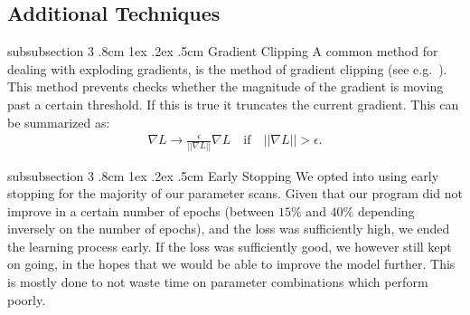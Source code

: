 \documentclass[%
reprint,
amsmath,amssymb,
aps,
]{revtex4-2}
\makeatletter
\renewcommand{\subsubsection}{%
	\@startsection
	{subsubsection}%
	{3}%
	{\z@}%
	{.8cm \@plus1ex \@minus .2ex}%
	{.5cm}%
	{\normalfont\small\centering}%
}
\makeatother
\begin{document}
\subsection{Additional Techniques}
\subsubsection{Gradient Clipping}
A common method for dealing with exploding gradients, is the method of gradient clipping (see e.g.~\cite{Goodfellow-et-al-2016}). This method prevents checks whether the magnitude of the gradient is moving past a certain threshold. If this is true it truncates the current gradient. This can be summarized as:
\begin{align}	\label{eq:clipping}
	\nabla L \rightarrow \frac{\epsilon}{||\nabla L||}\nabla L\quad\text{if}\quad||\nabla L|| > \epsilon.
\end{align}

\subsubsection{Early Stopping}
We opted into using early stopping for the majority of our parameter scans. Given that our program did not improve in a certain number of epochs (between $15\%$ and $40\%$ depending inversely on the number of epochs), and the loss was sufficiently high, we ended the learning process early. If the loss was sufficiently good, we however still kept on going, in the hopes that we would be able to improve the model further. This is mostly done to not waste time on parameter combinations which perform poorly. 
\end{document}
